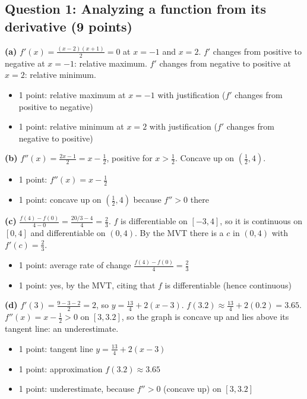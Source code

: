 \documentclass{apcalc}
\begin{document}
\subsection*{Question 1: Analyzing a function from its derivative (9 points)}
\textbf{(a)} $f'(x)=\frac{(x-2)(x+1)}{2}=0$ at $x=-1$ and $x=2$. $f'$ changes from positive to negative at $x=-1$: relative maximum. $f'$ changes from negative to positive at $x=2$: relative minimum.
\begin{itemize}[leftmargin=1.6em,itemsep=0pt]
\item 1 point: relative maximum at $x=-1$ with justification ($f'$ changes from positive to negative)
\item 1 point: relative minimum at $x=2$ with justification ($f'$ changes from negative to positive)
\end{itemize}
\textbf{(b)} $f''(x)=\frac{2x-1}{2}=x-\frac12$, positive for $x>\frac12$. Concave up on $(\frac12,4)$.
\begin{itemize}[leftmargin=1.6em,itemsep=0pt]
\item 1 point: $f''(x)=x-\frac12$
\item 1 point: concave up on $(\frac12,4)$ because $f''>0$ there
\end{itemize}
\textbf{(c)} $\frac{f(4)-f(0)}{4-0}=\frac{20/3-4}{4}=\frac23$. $f$ is differentiable on $[-3,4]$, so it is continuous on $[0,4]$ and differentiable on $(0,4)$. By the MVT there is a $c$ in $(0,4)$ with $f'(c)=\frac23$.
\begin{itemize}[leftmargin=1.6em,itemsep=0pt]
\item 1 point: average rate of change $\frac{f(4)-f(0)}{4}=\frac23$
\item 1 point: yes, by the MVT, citing that $f$ is differentiable (hence continuous)
\end{itemize}
\textbf{(d)} $f'(3)=\frac{9-3-2}{2}=2$, so $y=\frac{13}{4}+2(x-3)$. $f(3.2)\approx\frac{13}{4}+2(0.2)=3.65$. $f''(x)=x-\frac12>0$ on $[3,3.2]$, so the graph is concave up and lies above its tangent line: an underestimate.
\begin{itemize}[leftmargin=1.6em,itemsep=0pt]
\item 1 point: tangent line $y=\frac{13}{4}+2(x-3)$
\item 1 point: approximation $f(3.2)\approx3.65$
\item 1 point: underestimate, because $f''>0$ (concave up) on $[3,3.2]$
\end{itemize}
\end{document}
